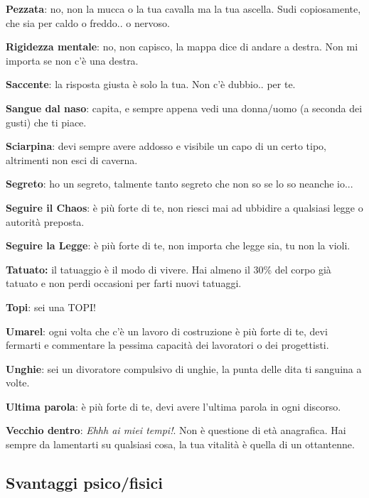 \documentclass[a4paper,twoside,openany]{book}
\begin{document}
\begin{multicols}{2}
\textbf{Pezzata}: no, non la mucca o la tua cavalla ma la tua ascella. Sudi copiosamente, che sia per caldo o freddo.. o nervoso.

\textbf{Rigidezza mentale}: no, non capisco, la mappa dice di andare a destra. Non mi importa se non c'è una destra.

\textbf{Saccente}: la risposta giusta è solo la tua. Non c'è dubbio.. per te.

\textbf{Sangue dal naso}: capita, e sempre appena vedi una donna/uomo (a seconda dei gusti) che ti piace.

\textbf{Sciarpina}: devi sempre avere addosso e visibile un capo di un certo tipo, altrimenti non esci di caverna.

\textbf{Segreto}: ho un segreto, talmente tanto segreto che non so se lo so neanche io...

\textbf{Seguire il Chaos}: è più forte di te, non riesci mai ad ubbidire a qualsiasi legge o autorità preposta.

\textbf{Seguire la Legge}: è più forte di te, non importa che legge sia, tu non la violi.

\textbf{Tatuato:} il tatuaggio è il modo di vivere. Hai almeno il 30\% del corpo già tatuato e non perdi occasioni per farti nuovi tatuaggi.

\textbf{Topi}: sei una TOPI!

\textbf{Umarel}: ogni volta che c'è un lavoro di costruzione è più forte di te, devi fermarti e commentare la pessima capacità dei lavoratori o dei progettisti.

\textbf{Unghie}: sei un divoratore compulsivo di unghie, la punta delle dita ti sanguina a volte.

\textbf{Ultima parola}: è più forte di te, devi avere l'ultima parola in ogni discorso.

\textbf{Vecchio dentro}: \emph{Ehhh ai miei tempi!}. Non è questione di età anagrafica. Hai sempre da lamentarti su qualsiasi cosa, la tua vitalità è quella di un ottantenne.

\end{multicols}

\pagebreak

\subsection{Svantaggi psico/fisici}
\end{document}
